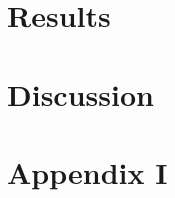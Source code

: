 \documentclass[10pt, a4]{article}
\begin{document}
\section{Results}
\blindtext

\section{Discussion}
\blindtext




\setlength{\bibhang}{.125in}
\setlength{\bibindent}{-\bibhang}

\vfill
\pagebreak



\appendix
\section{Appendix I} \label{appendix_I_sentences}
\end{document}
